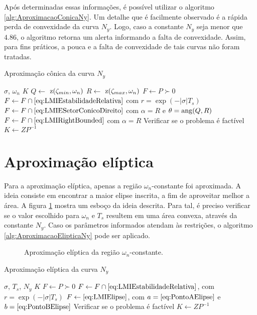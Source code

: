 Após determinadas essas informações, é possível utilizar o algoritmo \ref{alg:AproximacaoConicaNy}. Um detalhe que é facilmente observado é a rápida perda de convexidade da curva $N_y$. Logo, caso a constante $N_y$ seja menor que $4.86$\cite{CHIQUETO2021}, o algoritmo retorna um alerta informando a falta de convexidade. Assim, para fins práticos, a pouca e a falta de convexidade de tais curvas não foram tratadas.
\begin{algorithm}[hb!]
\caption{Aproximação cônica da curva $N_y$}\label{alg:AproximacaoConicaNy}
\begin{algorithmic}[1]
\Require $\sigma$, $\omega_n$
\Ensure $K$
\State $Q \gets $ $\operatorname{\mathrm{z}}(\zeta_{min},\omega_n)$
\State $R \gets $ $\operatorname{\mathrm{z}}(\zeta_{max},\omega_n)$
\State $F \gets P \succ 0$
\State $F \gets F \cap \eqref{eq:LMIEstabilidadeRelativa}$ com $r = \exp{\left(-|\sigma|T_s\right)}$ 
\State $F \gets F \cap \eqref{eq:LMIESetorConicoDireito}$ com $\alpha = R$ e $\theta = \operatorname{ang}(Q,R)$ 
\State $F \gets F \cap \eqref{eq:LMIRightBounded}$ com $\alpha = R$ 
\State Verificar se o problema é factível
\State $K \gets ZP^{-1}$
\end{algorithmic}
\end{algorithm}

\section{Aproximação elíptica}
Para a aproximação elíptica, apenas a região $\omega_n$-constante foi aproximada. A ideia consiste em encontrar a maior elipse inscrita, a fim de aproveitar melhor a área. A figura \ref{fig:AproximacaoEliptica} mostra um esboço da ideia descrita. Para tal, é preciso verificar se o valor escolhido para $\omega_n$ e $T_s$ resultem em uma área convexa\cite{CHIQUETO2021}, através da constante $N_y$. Caso os parâmetros informados atendam às restrições, o algoritmo \ref{alg:AproximacaoElipticaNy} pode ser aplicado.
\begin{figure}[!ht]
\centering

\caption{Aproximação elíptica da região $\omega_n$-constante.}
\label{fig:AproximacaoEliptica}
\end{figure}

\begin{algorithm}[hb!]
\caption{Aproximação elíptica da curva $N_y$}\label{alg:AproximacaoElipticaNy}
\begin{algorithmic}[1]
\Require $\sigma$, $T_s$, $N_y$
\Ensure $K$
\State $F \gets P \succ 0$
\State $F \gets F \cap \eqref{eq:LMIEstabilidadeRelativa}$, com $r = \exp{\left(-|\sigma|T_s\right)}$ 
\State $F \gets \eqref{eq:LMIElipse}$, com $a = \eqref{eq:PontoAElipse}$ e $b = \eqref{eq:PontoBElipse}$ 
\State Verificar se o problema é factível
\State $K \gets ZP^{-1}$
\end{algorithmic}
\end{algorithm}

